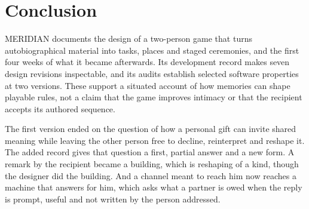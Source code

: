 \documentclass[sigconf,nonacm]{acmart}
\begin{document}
\section{Conclusion}
MERIDIAN documents the design of a two-person game that turns autobiographical material into
tasks, places and staged ceremonies, and the first four weeks of what it became afterwards. Its
development record makes seven design revisions inspectable, and its audits establish selected
software properties at two versions. These support a situated account of how memories can shape
playable rules, not a claim that the game improves intimacy or that the recipient accepts its
authored sequence.

The first version ended on the question of how a personal gift can invite shared meaning while
leaving the other person free to decline, reinterpret and reshape it. The added record gives
that question a first, partial answer and a new form. A remark by the recipient became a
building, which is reshaping of a kind, though the designer did the building. And a channel
meant to reach him now reaches a machine that answers for him, which asks what a partner is
owed when the reply is prompt, useful and not written by the person addressed.
\end{document}
